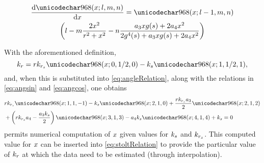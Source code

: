 \begin{multline}
 \frac{\d\shelp{l}{m}{n}}{\d\xang} = \shelp{l-1}{m}{n}\\
 \left(l-m\frac{2\xang^2}{\targetrange^2+\xang^2} - n\frac{\rcoeff_3\xang\gfunc(\xparm) + 2\rcoeff_4\xang^2}{2\gfunc^4(\xparm) + \rcoeff_3\xang\gfunc(\xparm) + 2\rcoeff_4\xang^2}\right)
\end{multline}
\par
With the aforementioned definition,
\begin{equation}
 \kr = \targetrange\krstolt\shelp{0}{1/2}{0} - \kparm\shelp{1}{1/2}{1},
 \label{eq:stoltRelation}
\end{equation}
and, when this is substituted into \eqref{eq:angleRelation}, along with the relations in \eqref{eq:angsin} and \eqref{eq:angcos}, one obtains
\begin{equation}
\begin{split}
 &\targetrange\krstolt\shelp{1}{1}{-1} - \kparm\shelp{2}{1}{0}
 +\frac{\targetrange\krstolt\rcoeff_3}{2}\shelp{2}{1}{2}\\
 &+\left(\targetrange\krstolt\rcoeff_4-\frac{\rcoeff_3\kparm}{2}\right)\shelp{3}{1}{3}
 - \rcoeff_4\kparm\shelp{4}{1}{4} + \kparm = 0
\end{split}
\label{eq:stoltInversionX}
\end{equation}
 permits numerical computation of $x$ given values for $k_{s}$ and $k_{r_s}$. This computed value for $x$ can be inserted into \eqref{eq:stoltRelation} to provide the particular value of $k_r$ at which the data need to be estimated (through interpolation).

